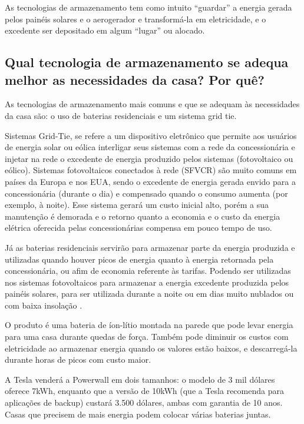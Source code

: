 	As tecnologias de armazenamento tem como intuito “guardar” a energia gerada pelos painéis solares e o aerogerador e transformá-la em eletricidade, e o excedente ser depositado em algum “lugar” ou alocado.

\subsection{Qual tecnologia de armazenamento se adequa melhor as necessidades da casa? Por quê?}

	As tecnologias de armazenamento mais comuns e que se adequam às necessidades da casa são: o uso de baterias residenciais e um sistema grid tie.

	Sistemas Grid-Tie, se refere a um dispositivo eletrônico que permite aos
usuários de energia solar ou eólica interligar seus sistemas com a rede da
concessionária e injetar na rede o excedente de energia produzido pelos
sistemas (fotovoltaico ou eólico)\cite{neosolarinversorfronius}. Sistemas
fotovoltaicos conectados à rede (SFVCR) são muito comuns em países da Europa e
nos EUA, sendo o excedente de energia gerada envido para a concessionária
(durante o dia) e compensado quando o consumo aumenta (por exemplo, à noite).
Esse sistema gerará um custo inicial alto, porém a sua manutenção é demorada e
o retorno quanto a economia e o custo da energia elétrica oferecida pelas
concessionárias compensa em pouco tempo de uso.

	Já as baterias residenciais servirão para armazenar parte da energia produzida e utilizadas quando houver picos de energia quanto à energia retornada pela concessionária, ou afim de economia referente às tarifas. Podendo ser utilizadas nos sistemas fotovoltaicos para armazenar a energia excedente produzida pelos painéis solares, para ser utilizada durante a noite ou em dias muito nublados ou com baixa insolação \cite{minhacasasolar}.

	O produto é uma bateria de íon-lítio montada na parede que pode levar energia para uma casa durante quedas de força. Também pode diminuir os custos com eletricidade ao armazenar energia quando os valores estão baixos, e descarregá-la durante horas de picos com custo maior.

	A Tesla venderá a Powerwall em dois tamanhos: o modelo de 3 mil dólares oferece 7kWh, enquanto que a versão de 10kWh (que a Tesla recomenda para aplicações de backup) custará 3.500 dólares, ambas com garantia de 10 anos. Casas que precisem de mais energia podem colocar várias baterias juntas.\cite{Powerwall}

